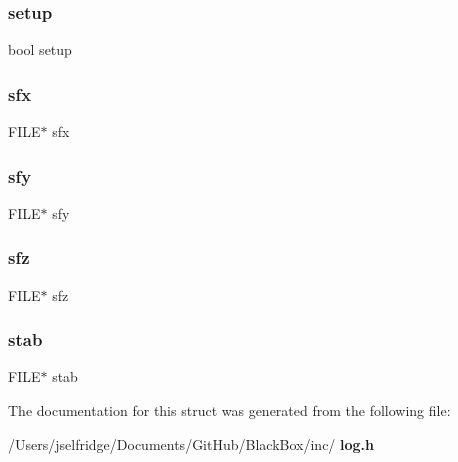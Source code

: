 \subsubsection{setup}
{\footnotesize\ttfamily bool setup}

\mbox{\label{structdatalog__struct_a7bfdbb990d97870ecf759463e386979a}} 
\subsubsection{sfx}
{\footnotesize\ttfamily F\+I\+LE$\ast$ sfx}

\mbox{\label{structdatalog__struct_aba7bdaa5d2aeaedbebe262fd3550c0ab}} 
\subsubsection{sfy}
{\footnotesize\ttfamily F\+I\+LE$\ast$ sfy}

\mbox{\label{structdatalog__struct_a36fd3c043354acaa26ccf231ef4e376e}} 
\subsubsection{sfz}
{\footnotesize\ttfamily F\+I\+LE$\ast$ sfz}

\mbox{\label{structdatalog__struct_a1cd11e19a8c474cfb9a4d63e6073b91d}} 
\subsubsection{stab}
{\footnotesize\ttfamily F\+I\+LE$\ast$ stab}



The documentation for this struct was generated from the following file\+:\begin{DoxyCompactItemize}
\item 
/\+Users/jselfridge/\+Documents/\+Git\+Hub/\+Black\+Box/inc/\textbf{ log.\+h}\end{DoxyCompactItemize}
